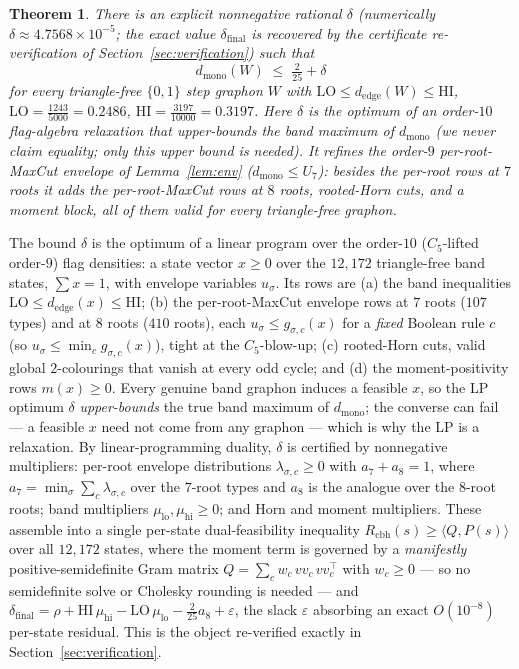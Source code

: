 \documentclass[11pt]{article}
\newtheorem{theorem}{Theorem}[section]
\theoremstyle{remark}
\newcommand{\dmono}{d_{\mathrm{mono}}}
\begin{document}
\begin{theorem}\label{thm:band}
There is an explicit nonnegative rational $\delta$ \textup{(}numerically
$\delta\approx 4.7568\times10^{-5}$; the exact value $\delta_{\mathrm{final}}$ is
recovered by the certificate re-verification of Section~\ref{sec:verification}\textup{)}
such that
\[
  \dmono(W)\;\le\;\tfrac{2}{25}+\delta
\]
for every triangle-free $\{0,1\}$ step graphon $W$ with
$\mathrm{LO}\le d_{\mathrm{edge}}(W)\le\mathrm{HI}$,
$\mathrm{LO}=\tfrac{1243}{5000}=0.2486$, $\mathrm{HI}=\tfrac{3197}{10000}=0.3197$.
Here $\delta$ is the optimum of an order-$10$ flag-algebra relaxation that
\emph{upper-bounds} the band maximum of $\dmono$ (we never claim equality; only this
upper bound is needed). It refines the order-$9$ per-root-MaxCut envelope of
Lemma~\ref{lem:env} \textup{(}$\dmono\le U_7$\textup{)}: besides the per-root rows at
$7$ roots it adds the per-root-MaxCut rows at $8$ roots, rooted-Horn cuts, and a
moment block, all of them valid for every triangle-free graphon.
\end{theorem}

The bound $\delta$ is the optimum of a linear program over the order-$10$
($C_5$-lifted order-$9$) flag densities: a state vector $x\ge0$ over the $12{,}172$
triangle-free band states, $\sum x=1$, with envelope variables $u_\sigma$. Its rows
are (a) the band inequalities $\mathrm{LO}\le d_{\mathrm{edge}}(x)\le\mathrm{HI}$;
(b) the per-root-MaxCut envelope rows at $7$ roots ($107$ types) and at $8$ roots
($410$ roots), each $u_\sigma\le g_{\sigma,c}(x)$ for a \emph{fixed} Boolean rule $c$
(so $u_\sigma\le\min_c g_{\sigma,c}(x)$), tight at the $C_5$-blow-up; (c) rooted-Horn
cuts, valid global $2$-colourings that vanish at every odd cycle; and (d) the
moment-positivity rows $m(x)\ge0$. Every genuine band graphon induces a feasible $x$,
so the LP optimum $\delta$ \emph{upper-bounds} the true band maximum of $\dmono$; the
converse can fail --- a feasible $x$ need not come from any graphon --- which is why
the LP is a relaxation. By linear-programming duality, $\delta$ is certified by
nonnegative multipliers: per-root envelope distributions $\lambda_{\sigma,c}\ge0$
with $a_7+a_8=1$, where $a_7=\min_\sigma\sum_c\lambda_{\sigma,c}$ over the $7$-root
types and $a_8$ is the analogue over the $8$-root roots; band multipliers
$\mu_{\mathrm{lo}},\mu_{\mathrm{hi}}\ge0$; and Horn and moment multipliers. These
assemble into a single per-state dual-feasibility inequality
$R_{\mathrm{cbh}}(s)\ge\langle Q,P(s)\rangle$ over all $12{,}172$ states, where the
moment term is governed by a \emph{manifestly} positive-semidefinite Gram matrix
$Q=\sum_c w_c\,vv_c\,vv_c^\top$ with $w_c\ge0$ --- so no semidefinite solve or
Cholesky rounding is needed --- and
$\delta_{\mathrm{final}}=\rho+\mathrm{HI}\,\mu_{\mathrm{hi}}-\mathrm{LO}\,\mu_{\mathrm{lo}}
-\tfrac{2}{25}a_8+\varepsilon$, the slack $\varepsilon$ absorbing an exact
$O(10^{-8})$ per-state residual. This is the object re-verified exactly in
Section~\ref{sec:verification}.
\end{document}
